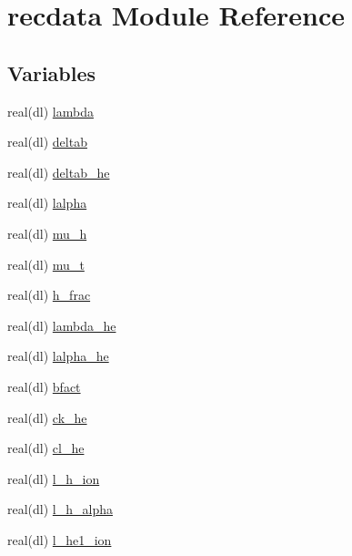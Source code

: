\hypertarget{namespacerecdata}{}\section{recdata Module Reference}
\label{namespacerecdata}
\subsection*{Variables}
\begin{DoxyCompactItemize}
\item 
real(dl) \mbox{\hyperlink{namespacerecdata_a2c475bdeb3e0999a1360325ceae144c2}{lambda}}
\item 
real(dl) \mbox{\hyperlink{namespacerecdata_a5430ac96b61e841e793860353de75b94}{deltab}}
\item 
real(dl) \mbox{\hyperlink{namespacerecdata_ac9a28ec71046fead8431567d914339e5}{deltab\+\_\+he}}
\item 
real(dl) \mbox{\hyperlink{namespacerecdata_af77171b4139af45b976e7388f08ad74a}{lalpha}}
\item 
real(dl) \mbox{\hyperlink{namespacerecdata_af00c668a1086ccf9c6fb815e45e5c9dd}{mu\+\_\+h}}
\item 
real(dl) \mbox{\hyperlink{namespacerecdata_afca9c6c4a945b5d2b59ca00f446f869a}{mu\+\_\+t}}
\item 
real(dl) \mbox{\hyperlink{namespacerecdata_ae9965fc6c0b6f37a85b51427e8155eb3}{h\+\_\+frac}}
\item 
real(dl) \mbox{\hyperlink{namespacerecdata_a2eac004fa1bc20ce7480574fc7e7f8ec}{lambda\+\_\+he}}
\item 
real(dl) \mbox{\hyperlink{namespacerecdata_aef43ee94c4fd432972ea10fe6e93f8bb}{lalpha\+\_\+he}}
\item 
real(dl) \mbox{\hyperlink{namespacerecdata_a98e25aebe5900dc1cca84fe8be016dc4}{bfact}}
\item 
real(dl) \mbox{\hyperlink{namespacerecdata_a13fa08cdf3070bc28dbc41bac31f8992}{ck\+\_\+he}}
\item 
real(dl) \mbox{\hyperlink{namespacerecdata_ae811f636720451c3155e017e57bb09cf}{cl\+\_\+he}}
\item 
real(dl) \mbox{\hyperlink{namespacerecdata_ae841ee816424d8ed36613769eac72b75}{l\+\_\+h\+\_\+ion}}
\item 
real(dl) \mbox{\hyperlink{namespacerecdata_adb25613b2cf535a5250d0040b5da8e8e}{l\+\_\+h\+\_\+alpha}}
\item 
real(dl) \mbox{\hyperlink{namespacerecdata_a88ef0c92d1cad9570136fa55d1899af0}{l\+\_\+he1\+\_\+ion}}

\end{DoxyCompactItemize}
